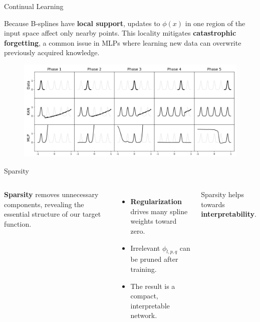 \documentclass[aspectratio=169]{beamer}
\begin{document}

\begin{frame}{Continual Learning}
	
	Because B-splines have \textbf{local support}, updates to $\phi(x)$ in one region of the input space affect only nearby points.  
	This locality mitigates \textbf{catastrophic forgetting}, a common issue in MLPs where learning new data can overwrite previously acquired knowledge.
	
	\begin{figure}
		\centering
		\includegraphics[width=0.8\linewidth]{../images/continual_learning.png}
	\end{figure}
	
\end{frame}



\begin{frame}{Sparsity}
	\begin{columns}[T,onlytextwidth]
		
		
		\textbf{Sparsity} removes unnecessary components, revealing the essential structure of our target function.
		
		\vspace{0.6em}
		\begin{itemize}
			\item \textbf{Regularization} drives many spline weights toward zero.
			\item Irrelevant $\phi_{l,p,q}$ can be pruned after training.
			\item The result is a compact, interpretable network.
		\end{itemize}
		
		Sparsity helps towards \textbf{interpretability}.
		
		\centering
		\resizebox{\linewidth}{!}{}
		
	\end{columns}
\end{frame}
\end{document}
